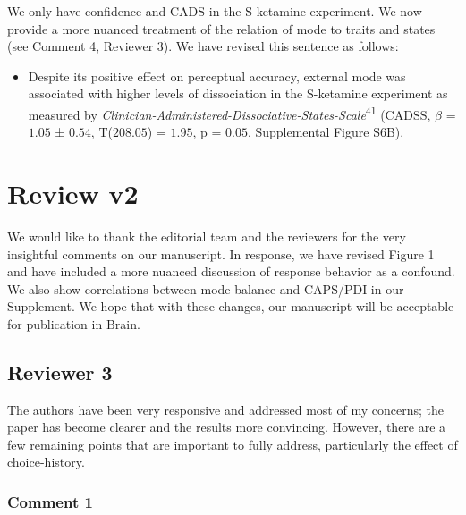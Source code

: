 \documentclass[
]{article}
\providecommand{\tightlist}{%
  \setlength{\itemsep}{0pt}\setlength{\parskip}{0pt}}
\begin{document}
We only have confidence and CADS in the S-ketamine experiment. We now
provide a more nuanced treatment of the relation of mode to traits and
states (see Comment 4, Reviewer 3). We have revised this sentence as
follows:

\begin{itemize}
\tightlist
\item
  Despite its positive effect on perceptual accuracy, external mode was
  associated with higher levels of dissociation in the S-ketamine
  experiment as measured by
  \emph{Clinician-Administered-Dissociative-States-Scale}\textsuperscript{41}
  (CADSS, \(\beta\) = \(1.05\) ± \(0.54\), T(\(208.05\)) = \(1.95\), p =
  \(0.05\), Supplemental Figure S6B).
\end{itemize}

\newpage

\section{Review v2}\label{review-v2}

We would like to thank the editorial team and the reviewers for the very
insightful comments on our manuscript. In response, we have revised
Figure 1 and have included a more nuanced discussion of response
behavior as a confound. We also show correlations between mode balance
and CAPS/PDI in our Supplement. We hope that with these changes, our
manuscript will be acceptable for publication in Brain.

\subsection{Reviewer 3}\label{reviewer-3}

The authors have been very responsive and addressed most of my concerns;
the paper has become clearer and the results more convincing. However,
there are a few remaining points that are important to fully address,
particularly the effect of choice-history.

\subsubsection{Comment 1}\label{comment-1-3}
\end{document}
